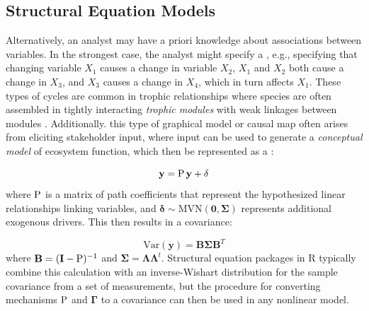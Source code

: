 \subsection{Structural Equation Models} \label{sec:Chap4_SEM}
Alternatively, an analyst may have a priori knowledge about associations between variables.  In the strongest case, the analyst might specify a , e.g., specifying that changing variable \(X_1\) causes a change in variable \(X_2\), \(X_1\) and \(X_2\) both cause a change in \(X_3\), and \(X_3\) causes a change in \(X_4\), which in turn affects \(X_1\).  These types of cycles are common in trophic relationships where species are often assembled in tightly interacting \textit{trophic modules} with weak linkages between modules \cite{holt_community_1997}.  Additionally. this type of graphical model or causal map often arises from eliciting stakeholder input, where input can be used to generate a \textit{conceptual model} of ecosystem function, which then be represented as a  \cite{kaplan_structural_2001}:

\begin{equation}
    \mathbf{y} = \mathbf{\operatorname{P} y} + \mathbf{\delta}    
\end{equation}
where \( \mathbf{\operatorname{P}} \) is a matrix of path coefficients that represent the hypothesized linear relationships linking variables, and \( \mathbf{\delta} \sim \mathrm{MVN}(\mathbf{0},\mathbf{\Sigma}) \) represents additional exogenous drivers.  This then results in a covariance:

\begin{equation} \label{eq:Chap4_SEM_covariance}
    \mathrm{Var}(\mathbf{y}) = \mathbf{B} \mathbf{\Sigma} \mathbf{B}^T    
\end{equation}
where \( \mathbf{B} = (\mathbf{I-\operatorname{P}})^{-1} \) and \( \mathbf{\Sigma=\Lambda \Lambda}^t \). Structural equation packages in R \cite{fox_sem_2020} typically combine this calculation with an inverse-Wishart distribution for the sample covariance from a set of measurements, but the procedure for converting mechanisms \( \mathbf{\operatorname{P}} \) and \( \mathbf{\Gamma} \) to a covariance can then be used in any nonlinear model.  

